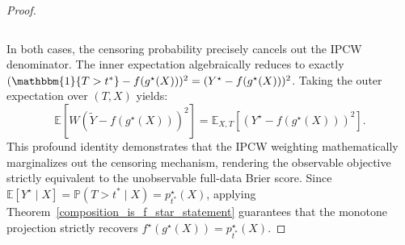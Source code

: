 \documentclass[11pt]{article}
\theoremstyle{plain}
\theoremstyle{plain}
\theoremstyle{plain}
\theoremstyle{plain}
\theoremstyle{plain}
\theoremstyle{plain}
\theoremstyle{plain}
\begin{document}
\begin{proof}
\begin{enumerate}
\[    \]
\end{enumerate}
In both cases, the censoring probability precisely cancels out the IPCW denominator. The inner expectation algebraically reduces to exactly $(\mathbbm{1}\{T > t^*\} - f(g^\star(X)))^2 = (Y^\star - f(g^\star(X)))^2$. Taking the outer expectation over $(T,X)$ yields:
\[
\mathbb{E} \left[ W \left(\tilde{Y} - f(g^\star(X))\right)^2 \right] = \mathbb{E}_{X, T} \left[ \left(Y^\star - f(g^\star(X))\right)^2 \right].
\]
This profound identity demonstrates that the IPCW weighting mathematically marginalizes out the censoring mechanism, rendering the observable objective strictly equivalent to the unobservable full-data Brier score. Since $\mathbb{E}[Y^\star \mid X] = \mathbb{P}(T > t^* \mid X) = p^{\star}_{t^*}(X)$, applying Theorem~\ref{composition_is_f_star_statement} guarantees that the monotone projection strictly recovers $f^{\star}(g^\star(X)) = p^{\star}_{t^*}(X)$.
\end{proof}
\end{document}

